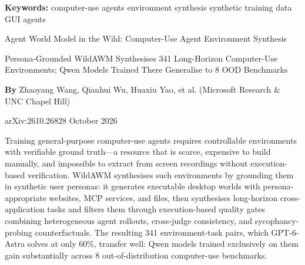 \documentclass[10pt,twocolumn]{article}
\begin{document}
\setlength{\parindent}{0pt}
\setlength{\parskip}{4pt}

{\small\color{keywordgray}\textbf{Keywords:}
  computer-use agents \textbullet{}
  environment synthesis \textbullet{}
  synthetic training data \textbullet{}
  GUI agents}\par\vspace{4pt}

{\LARGE\bfseries\raggedright
  Agent World Model in the Wild: Computer-Use Agent
  Environment Synthesis}\par\vspace{4pt}

{\large\itshape\raggedright
  Persona-Grounded WildAWM Synthesises 341 Long-Horizon Computer-Use
  Environments; Qwen Models Trained There Generalise to 8 OOD Benchmarks}\par\vspace{6pt}

{\small\textbf{By} Zhaoyang Wang, Qianhui Wu, Huaxiu Yao, et al.
  (Microsoft Research \& UNC Chapel Hill)}\par\vspace{2pt}

{\small\color{keywordgray}arXiv:2610.26828 \textbullet{}
  October 2026}
\par\vspace{2pt}\noindent{\color{rulered}\rule{\columnwidth}{0.6pt}}\vspace{6pt}

Training general-purpose computer-use agents requires controllable
environments with verifiable ground truth---a resource that is scarce,
expensive to build manually, and impossible to extract from screen
recordings without execution-based verification. WildAWM synthesises such
environments by grounding them in synthetic user personas: it generates
executable desktop worlds with persona-appropriate websites, MCP services,
and files, then synthesises long-horizon cross-application tasks and filters
them through execution-based quality gates combining heterogeneous agent
rollouts, cross-judge consistency, and sycophancy-probing counterfactuals.
The resulting 341 environment-task pairs, which GPT-6-Astra solves at only
60\%, transfer well: Qwen models trained exclusively on them gain substantially
across 8 out-of-distribution computer-use benchmarks.
\end{document}
